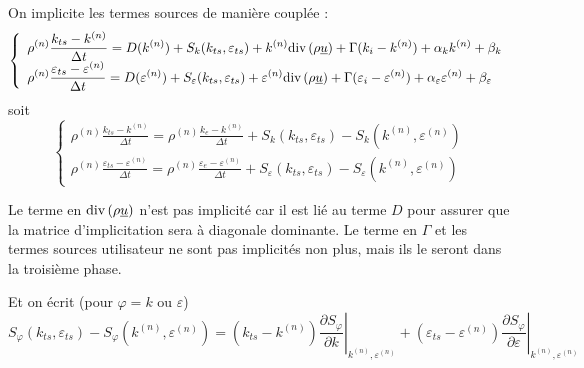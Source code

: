 
On implicite les termes sources de mani\`ere coupl\'ee :
\begin{equation}
\left\{\begin{array}{l}
\displaystyle
\rho^{(n)}\frac{k_{ts}-k^{(n)}}{\Delta t} =
D(k^{(n)}) + S_k(k_{ts},\varepsilon_{ts})
+k^{(n)}\text{div}\,(\rho\underline{u})+\Gamma(k_i-k^{(n)})+\alpha_k k^{(n)} +\beta_k\\
\displaystyle
\rho^{(n)}\frac{\varepsilon_{ts}-\varepsilon^{(n)}}{\Delta t}  =
D(\varepsilon^{(n)}) + S_\varepsilon(k_{ts},\varepsilon_{ts})
+\varepsilon^{(n)}\text{div}\,(\rho\underline{u})
+\Gamma(\varepsilon_i-\varepsilon^{(n)})
+\alpha_\varepsilon \varepsilon^{(n)} +\beta_\varepsilon
\end{array}\right.
\end{equation}
soit
\begin{equation}
\left\{\begin{array}{l}
\displaystyle
\rho^{(n)}\frac{k_{ts}-k^{(n)}}{\Delta t} =
\rho^{(n)}\frac{k_e-k^{(n)}}{\Delta t}
+S_k(k_{ts},\varepsilon_{ts})-S_k(k^{(n)},\varepsilon^{(n)})\\
\displaystyle
\rho^{(n)}\frac{\varepsilon_{ts}-\varepsilon^{(n)}}{\Delta t}  =
\rho^{(n)}\frac{\varepsilon_e-\varepsilon^{(n)}}{\Delta t}
+S_\varepsilon(k_{ts},\varepsilon_{ts})-S_\varepsilon(k^{(n)},\varepsilon^{(n)})
\end{array}\right.
\end{equation}

Le terme en $\text{div}\,(\rho\underline{u})$ n'est pas implicit\'e car il est li\'e au
terme $D$ pour assurer que la matrice d'implicitation sera \`a diagonale
dominante. Le terme en $\Gamma$ et les termes sources utilisateur ne sont
pas implicit\'es non plus, mais ils le seront dans la troisi\`eme phase.

Et on \'ecrit (pour $\varphi=k$ ou $\varepsilon$)
\begin{equation}
S_\varphi(k_{ts},\varepsilon_{ts})-S_\varphi(k^{(n)},\varepsilon^{(n)})
=(k_{ts}-k^{(n)})
\left.\frac{\partial S_\varphi}{\partial k}\right|_{k^{(n)},\varepsilon^{(n)}}
+(\varepsilon_{ts}-\varepsilon^{(n)})
\left.\frac{\partial S_\varphi}{\partial \varepsilon}\right|_{k^{(n)},\varepsilon^{(n)}}
\end{equation}

